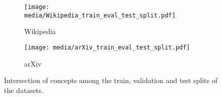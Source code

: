 \begin{figure}
    \centering
    \begin{subfigure}[t]{0.3\linewidth}
        \centering
        \texttt{[image: media/Wikipedia\_train\_eval\_test\_split.pdf]}
        \caption{Wikipedia}
    \end{subfigure}%
    \qquad\qquad
    \begin{subfigure}[t]{0.28\linewidth}
        \centering
        \texttt{[image: media/arXiv\_train\_eval\_test\_split.pdf]}
        \caption{arXiv}
    \end{subfigure}
    \caption{Intersection of concepts among the train, validation and test splits of the datasets.}
    \label{fig:dataset-overlap}
\end{figure}
